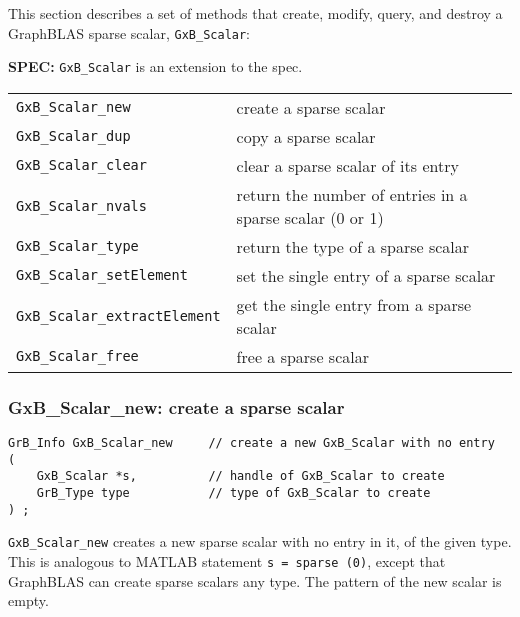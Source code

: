 \documentclass[12pt]{article}
\begin{document}
This section describes a set of methods that create, modify, query,
and destroy a GraphBLAS sparse scalar, \verb'GxB_Scalar':

\begin{spec}
{\bf SPEC:} \verb'GxB_Scalar' is an extension to the spec.
\end{spec}

\vspace{0.2in}
{\footnotesize
\begin{tabular}{ll}
\hline
\verb'GxB_Scalar_new'            & create a sparse scalar \\
\verb'GxB_Scalar_dup'            & copy a sparse scalar \\
\verb'GxB_Scalar_clear'          & clear a sparse scalar of its entry \\
\verb'GxB_Scalar_nvals'          & return the number of entries in a
                                   sparse scalar (0 or 1) \\
\verb'GxB_Scalar_type'           & return the type of a sparse scalar \\
\verb'GxB_Scalar_setElement'     & set the single entry of a sparse scalar \\
\verb'GxB_Scalar_extractElement' & get the single entry from a sparse scalar \\
\verb'GxB_Scalar_free'           & free a sparse scalar \\
\hline
\end{tabular}
}

\subsubsection{{\sf GxB\_Scalar\_new:} create a sparse scalar}
\label{scalar_new}

\begin{mdframed}[userdefinedwidth=6in]
{\footnotesize
\begin{verbatim}
GrB_Info GxB_Scalar_new     // create a new GxB_Scalar with no entry
(
    GxB_Scalar *s,          // handle of GxB_Scalar to create
    GrB_Type type           // type of GxB_Scalar to create
) ;
\end{verbatim}
} \end{mdframed}

\verb'GxB_Scalar_new' creates a new sparse scalar with no
entry in it, of the given type.  This is analogous to MATLAB statement
\verb's = sparse (0)', except that GraphBLAS can create sparse scalars any
type.  The pattern of the new scalar is empty.
\end{document}
